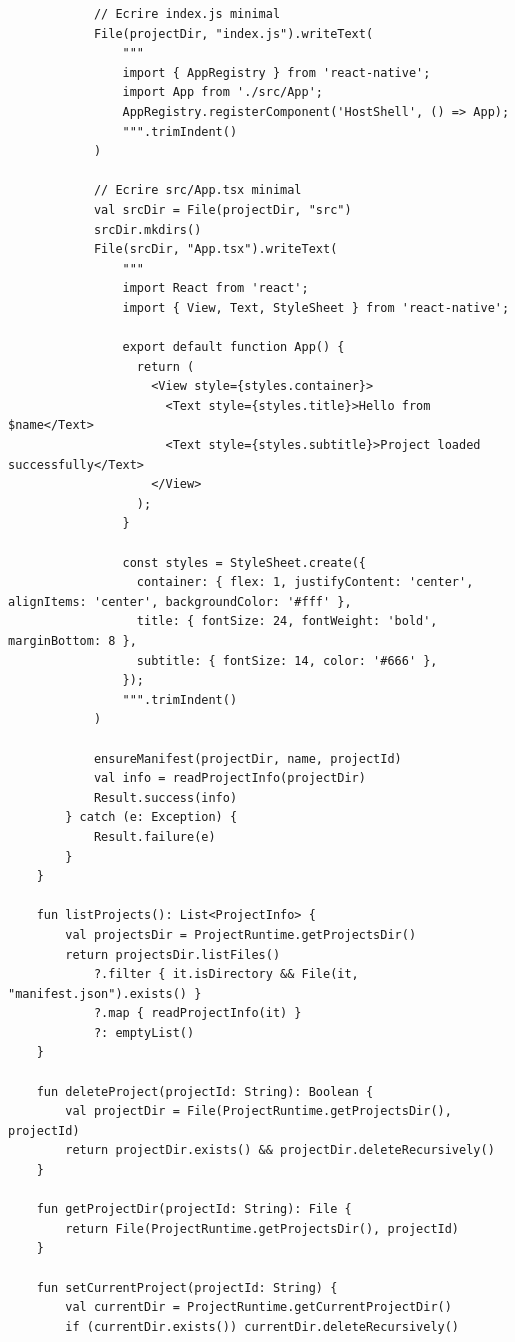 \documentclass[11pt]{article}
\begin{document}
\begin{verbatim}
            // Ecrire index.js minimal
            File(projectDir, "index.js").writeText(
                """
                import { AppRegistry } from 'react-native';
                import App from './src/App';
                AppRegistry.registerComponent('HostShell', () => App);
                """.trimIndent()
            )

            // Ecrire src/App.tsx minimal
            val srcDir = File(projectDir, "src")
            srcDir.mkdirs()
            File(srcDir, "App.tsx").writeText(
                """
                import React from 'react';
                import { View, Text, StyleSheet } from 'react-native';

                export default function App() {
                  return (
                    <View style={styles.container}>
                      <Text style={styles.title}>Hello from $name</Text>
                      <Text style={styles.subtitle}>Project loaded successfully</Text>
                    </View>
                  );
                }

                const styles = StyleSheet.create({
                  container: { flex: 1, justifyContent: 'center', alignItems: 'center', backgroundColor: '#fff' },
                  title: { fontSize: 24, fontWeight: 'bold', marginBottom: 8 },
                  subtitle: { fontSize: 14, color: '#666' },
                });
                """.trimIndent()
            )

            ensureManifest(projectDir, name, projectId)
            val info = readProjectInfo(projectDir)
            Result.success(info)
        } catch (e: Exception) {
            Result.failure(e)
        }
    }

    fun listProjects(): List<ProjectInfo> {
        val projectsDir = ProjectRuntime.getProjectsDir()
        return projectsDir.listFiles()
            ?.filter { it.isDirectory && File(it, "manifest.json").exists() }
            ?.map { readProjectInfo(it) }
            ?: emptyList()
    }

    fun deleteProject(projectId: String): Boolean {
        val projectDir = File(ProjectRuntime.getProjectsDir(), projectId)
        return projectDir.exists() && projectDir.deleteRecursively()
    }

    fun getProjectDir(projectId: String): File {
        return File(ProjectRuntime.getProjectsDir(), projectId)
    }

    fun setCurrentProject(projectId: String) {
        val currentDir = ProjectRuntime.getCurrentProjectDir()
        if (currentDir.exists()) currentDir.deleteRecursively()


\end{verbatim}
\end{document}
